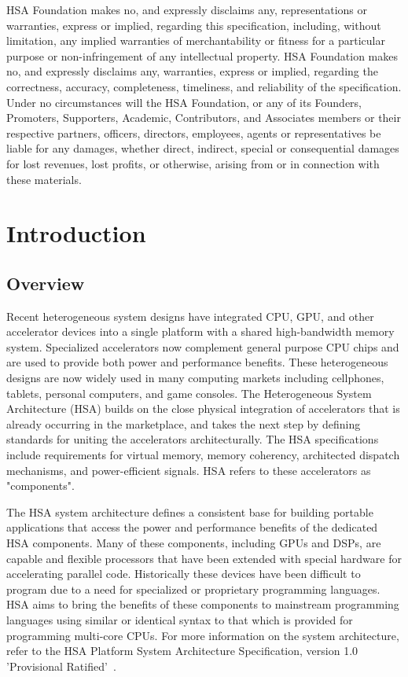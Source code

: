 \documentclass[final]{book}
\begin{document}
HSA Foundation makes no, and expressly disclaims any, representations or
warranties, express or implied, regarding this specification, including, without
limitation, any implied warranties of merchantability or fitness for a
particular purpose or non-infringement of any intellectual property. HSA
Foundation makes no, and expressly disclaims any, warranties, express or
implied, regarding the correctness, accuracy, completeness, timeliness, and
reliability of the specification. Under no circumstances will the HSA
Foundation, or any of its Founders, Promoters, Supporters, Academic,
Contributors, and Associates members or their respective partners, officers,
directors, employees, agents or representatives be liable for any damages,
whether direct, indirect, special or consequential damages for lost revenues,
lost profits, or otherwise, arising from or in connection with these materials.

\clearpage
{}
{} \tableofcontents

\clearpage
{}
\setcounter{page}{1}

\chapter{Introduction} \label{index}
\section{Overview}\label{overview}

Recent heterogeneous system designs have integrated CPU, GPU, and other
accelerator devices into a single platform with a shared high-bandwidth memory
system.  Specialized accelerators now complement general purpose CPU chips and
are used to provide both power and performance benefits.  These
heterogeneous designs are now widely used in many computing markets including
cellphones, tablets, personal computers, and game consoles. The Heterogeneous
System Architecture (HSA) builds on the close physical integration of
accelerators that is already occurring in the marketplace, and takes the next
step by defining standards for uniting the accelerators architecturally. The HSA
specifications include requirements for virtual memory, memory coherency,
architected dispatch mechanisms, and power-efficient signals. HSA refers to
these accelerators as "components".

The HSA system architecture defines a consistent base for building portable
applications that access the power and performance benefits of the dedicated HSA
components. Many of these components, including GPUs and DSPs, are capable and
flexible processors that have been extended with special hardware for
accelerating parallel code. Historically these devices have been difficult to
program due to a need for specialized or proprietary programming languages. HSA
aims to bring the benefits of these components to mainstream programming
languages using similar or identical syntax to that which is provided for
programming multi-core CPUs. For more information on the system architecture,
refer to the HSA Platform System Architecture Specification, version 1.0
'Provisional Ratified'~\cite{sar}.
\end{document}

